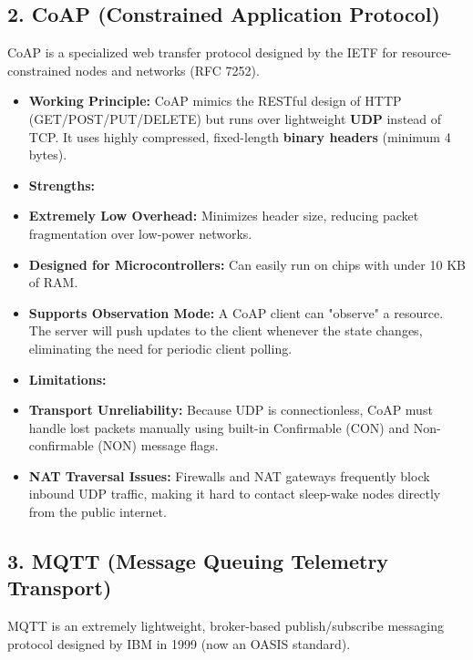 \subsection{2. CoAP (Constrained Application Protocol)}
CoAP is a specialized web transfer protocol designed by the IETF for resource-constrained nodes and networks (RFC 7252).

\begin{itemize}
  \item   \textbf{Working Principle:} CoAP mimics the RESTful design of HTTP (GET/POST/PUT/DELETE) but runs over lightweight \textbf{UDP} instead of TCP. It uses highly compressed, fixed-length \textbf{binary headers} (minimum 4 bytes).
  \item   \textbf{Strengths:}
  \item   \textbf{Extremely Low Overhead:} Minimizes header size, reducing packet fragmentation over low-power networks.
  \item   \textbf{Designed for Microcontrollers:} Can easily run on chips with under 10 KB of RAM.
  \item   \textbf{Supports Observation Mode:} A CoAP client can "observe" a resource. The server will push updates to the client whenever the state changes, eliminating the need for periodic client polling.
  \item   \textbf{Limitations:}
  \item   \textbf{Transport Unreliability:} Because UDP is connectionless, CoAP must handle lost packets manually using built-in Confirmable (CON) and Non-confirmable (NON) message flags.
  \item   \textbf{NAT Traversal Issues:} Firewalls and NAT gateways frequently block inbound UDP traffic, making it hard to contact sleep-wake nodes directly from the public internet.
\end{itemize}


\subsection{3. MQTT (Message Queuing Telemetry Transport)}
MQTT is an extremely lightweight, broker-based publish/subscribe messaging protocol designed by IBM in 1999 (now an OASIS standard).

